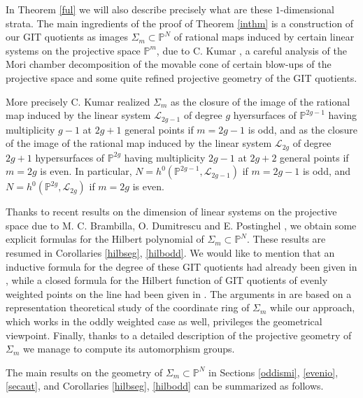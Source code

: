 \documentclass[a4paper,10pt]{amsart}
\theoremstyle{definition}
\begin{document}
In Theorem \ref{ful} we will also describe precisely what are these $1$-dimensional strata. The main ingredients of the proof of Theorem \ref{inthm} is a construction of our GIT quotients as images $\Sigma_m\subset\mathbb{P}^N$ of rational maps induced by certain linear systems on the projective space $\mathbb{P}^m$, due to C. Kumar \cite{Ku00, Ku03}, a careful analysis of the Mori chamber decomposition of the movable cone of certain blow-ups of the projective space and some quite refined projective geometry of the GIT quotients. 

More precisely C. Kumar realized $\Sigma_m$ as the closure of the image of the rational map induced by the linear system $\mathcal{L}_{2g-1}$ of degree $g$ hyersurfaces of $\mathbb{P}^{2g-1}$ having multiplicity $g-1$ at $2g+1$ general points if $m = 2g-1$ is odd, and as the closure of the image of the rational map induced by the linear system $\mathcal{L}_{2g}$ of degree $2g+1$ hypersurfaces of $\mathbb{P}^{2g}$ having multiplicity $2g-1$ at $2g+2$ general points if $m = 2g$ is even. In particular, $N = h^{0}(\mathbb{P}^{2g-1},\mathcal{L}_{2g-1})$ if $m = 2g-1$ is odd, and $N = h^{0}(\mathbb{P}^{2g},\mathcal{L}_{2g})$ if $m = 2g$ is even.

Thanks to recent results on the dimension of linear systems on the projective space due to M. C. Brambilla, O. Dumitrescu and E. Postinghel \cite{BDP16}, we obtain some explicit formulas for the Hilbert polynomial of $\Sigma_m\subset\mathbb{P}^N$. These results are resumed in Corollaries \ref{hilbseg}, \ref{hilbodd}. We would like to mention that an inductive formula for the degree of these GIT quotients had already been given in \cite{HMSV09}, while a closed formula for the Hilbert function of GIT quotients of evenly weighted points on the line had been given in \cite{HH14}. The arguments in \cite{HH14} are based on a representation theoretical study of the coordinate ring of $\Sigma_m$ while our approach, which works in the oddly weighted case as well, privileges the geometrical viewpoint. Finally, thanks to a detailed description of the projective geometry of $\Sigma_m$ we manage to compute its automorphism groups. 

The main results on the geometry of $\Sigma_m\subset\mathbb{P}^N$ in Sections \ref{oddismi}, \ref{evenio}, \ref{secaut}, and Corollaries \ref{hilbseg}, \ref{hilbodd} can be summarized as follows.
\end{document}
